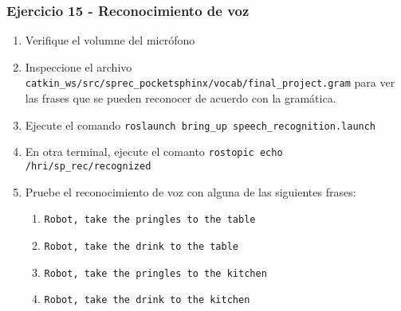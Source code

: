 \begin{frame}\frametitle{Ejercicio 15 - Reconocimiento de voz}
  \begin{enumerate}
  \item Verifique el volumne del micrófono
  \item Inspeccione el archivo \texttt{catkin\_ws/src/sprec\_pocketsphinx/vocab/final\_project.gram} para ver las frases que se pueden reconocer de acuerdo con la gramática.
  \item Ejecute el comando \texttt{roslaunch bring\_up speech\_recognition.launch}
  \item En otra terminal, ejecute el comanto \texttt{rostopic echo /hri/sp\_rec/recognized}
  \item Pruebe el reconocimiento de voz con alguna de las siguientes frases:
    \begin{enumerate}
    \item \texttt{Robot, take the pringles to the table}
    \item \texttt{Robot, take the drink to the table}
    \item \texttt{Robot, take the pringles to the kitchen}
    \item \texttt{Robot, take the drink to the kitchen}
    \end{enumerate}
  \end{enumerate}
\end{frame}
